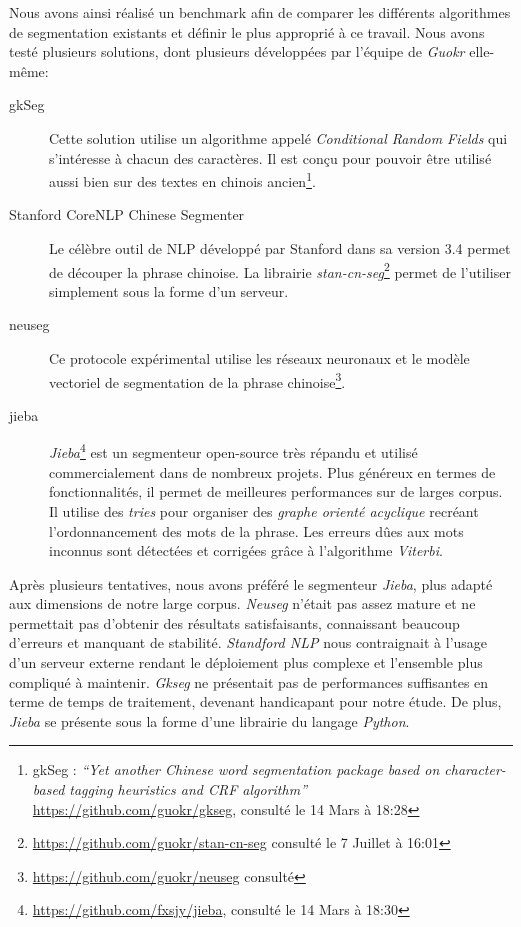     Nous avons ainsi réalisé un benchmark afin de comparer les différents algorithmes de segmentation existants et définir le plus approprié à ce travail. Nous avons testé plusieurs solutions, dont plusieurs développées par l'équipe de \textit{Guokr} elle-même:  

    \begin{description}
        \item[gkSeg] 
        Cette solution utilise un algorithme appelé \textit{Conditional Random Fields} qui s'intéresse à chacun des caractères. Il est conçu pour pouvoir être utilisé aussi bien sur des  textes en chinois ancien\footnote{ gkSeg : \textit{{\textquotedblleft}Yet another Chinese word segmentation package based on character-based tagging heuristics and CRF algorithm{\textquotedblright} }\url{https://github.com/guokr/gkseg}, consulté le 14 Mars à 18:28}.

        \item[Stanford CoreNLP Chinese Segmenter]
        Le célèbre outil de NLP développé par Stanford dans sa version 3.4 permet de découper la phrase chinoise. La librairie \textit{stan-cn-seg}\footnote{\url{https://github.com/guokr/stan-cn-seg} consulté le 7 Juillet à 16:01} permet de l'utiliser simplement sous la forme d'un serveur.

        \item[neuseg]
        Ce protocole expérimental utilise les réseaux neuronaux et le modèle vectoriel de segmentation de la phrase chinoise\footnote{\url{https://github.com/guokr/neuseg} consulté }.

        \item[jieba]
        \textit{Jieba}\footnote{ \url{https://github.com/fxsjy/jieba}, consulté le 14 Mars à 18:30} est un segmenteur open-source très répandu et utilisé commercialement dans de nombreux projets. Plus généreux en termes de fonctionnalités, il permet de meilleures performances sur de larges corpus. Il utilise des \textit{tries} pour organiser des \textit{graphe orienté acyclique} recréant l'ordonnancement des mots de la phrase. Les erreurs dûes aux mots inconnus sont détectées et corrigées grâce à l'algorithme \textit{Viterbi}.
    \end{description}

     Après plusieurs tentatives, nous avons préféré le segmenteur \textit{Jieba}, plus adapté aux dimensions de notre large corpus. \textit{Neuseg} n'était pas assez mature et ne permettait pas d'obtenir des résultats satisfaisants, connaissant beaucoup d'erreurs et manquant de stabilité. \textit{Standford NLP} nous contraignait à l'usage d'un serveur externe rendant le déploiement plus complexe et l'ensemble plus compliqué à maintenir. \textit{Gkseg} ne présentait pas de performances suffisantes en terme de temps de traitement, devenant handicapant pour notre étude. De plus, \textit{Jieba} se présente sous la forme d'une librairie du langage \textit{Python}.

